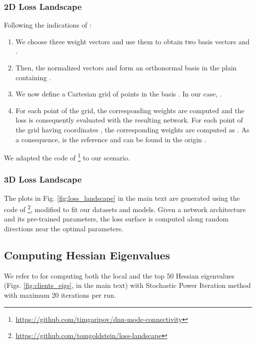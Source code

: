 \subsubsection{2D Loss Landscape} Following the indications of \cite{garipov2018loss,mirzadeh2020linear}:
\begin{enumerate}
    \item We choose three weight vectors  and use them to obtain two basis vectors  and .
    \item Then, the normalized vectors  and  form an orthonormal basis in the plain containing . 
    \item We now define a Cartesian grid of  points in the basis . In our case, . 
    \item For each point of the grid, the corresponding weights are computed and the loss is consequently evaluated with the resulting network. For each point  of the grid having coordinates , the corresponding weights are computed as . As a consequence,  is the reference and can be found in the origin .
\end{enumerate}
We adapted the code of \cite{garipov2018loss}\footnote{\url{https://github.com/timgaripov/dnn-mode-connectivity}} to our scenario.

\subsubsection{3D Loss Landscape} The plots in Fig. \ref{fig:loss_landscape} in the main text are generated using the code of \cite{visualloss}\footnote{\url{https://github.com/tomgoldstein/loss-landscape}}, modified to fit our datasets and models. Given a network architecture and its pre-trained parameters, the loss surface is computed along random directions near the optimal parameters.  

\subsection{Computing Hessian Eigenvalues}
We refer to \cite{hessian-eigenthings} for computing both the local and the top 50 Hessian eigenvalues (Figs. \ref{fig:clients_eigs},{\color{red}{5}}
in the main text) with Stochastic Power Iteration method \cite{xu2018accelerated} with maximum 20 iterations per run.

